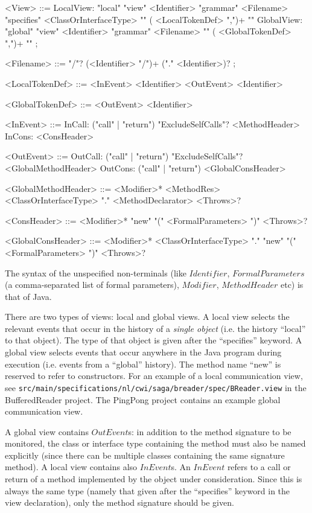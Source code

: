 \documentclass{article}
\begin{document}
\begin{grammar}
<View> ::=  LocalView: "local" "view" <Identifier> "grammar" <Filename> "specifies" <ClassOrInterfaceType> "{" (  <LocalTokenDef> ",")+ "}"
\alt GlobalView: "global" "view" <Identifier> "grammar" <Filename>                                   "{" ( <GlobalTokenDef> ",")+ "}"
  ;

<Filename> ::= "/"? (<Identifier> "/")+ ("." <Identifier>)?
  ;

<LocalTokenDef> ::=  <InEvent> <Identifier>
\alt <OutEvent> <Identifier>

<GlobalTokenDef> ::= <OutEvent> <Identifier>

<InEvent> ::= InCall: ("call" | "return") "ExcludeSelfCalls"? <MethodHeader>
\alt  InCons: <ConsHeader>

<OutEvent> ::= OutCall: ("call" | "return") "ExcludeSelfCalls"? <GlobalMethodHeader>
\alt OutCons: ("call" | "return") <GlobalConsHeader>
  
<GlobalMethodHeader> ::= <Modifier>* <MethodRes> <ClassOrInterfaceType> "." <MethodDeclarator> <Throws>?
  
<ConsHeader> ::= <Modifier>* "new" "(" <FormalParameters> ")" <Throws>?
  
<GlobalConsHeader> ::= <Modifier>* <ClassOrInterfaceType> "." "new" "(" <FormalParameters> ")" <Throws>?
\end{grammar}

The syntax of the unspecified non-terminals (like $Identifier$, $FormalParameters$ (a comma-separated list of formal parameters), $Modifier$, $MethodHeader$ etc) is that of Java.

There are two types of views: local and global views.  A local view selects the relevant events that occur in the history of a \emph{single object} (i.e. the history ``local'' to that object).  The type of that object is given after the ``specifies'' keyword.  A global view selects events that occur anywhere in the Java program during execution (i.e. events from a ``global'' history).  The method name ``new'' is reserved to refer to constructors. For an example of a local communication view,  see \lstinline+src/main/specifications/nl/cwi/saga/breader/spec/BReader.view+ in the BufferedReader project.  The PingPong project contains an example global communication view.

A global view contains $OutEvent$s: in addition to the method signature to be monitored, the class or interface type containing the method must also be named explicitly (since there can be multiple classes containing the same signature method).  A local view contains also $InEvent$s.  An $InEvent$ refers to a call or return of a method implemented by the object under consideration.  Since this is always the same type (namely that given after the ``specifies'' keyword in the view declaration), only the method signature should be given.
\end{document}
